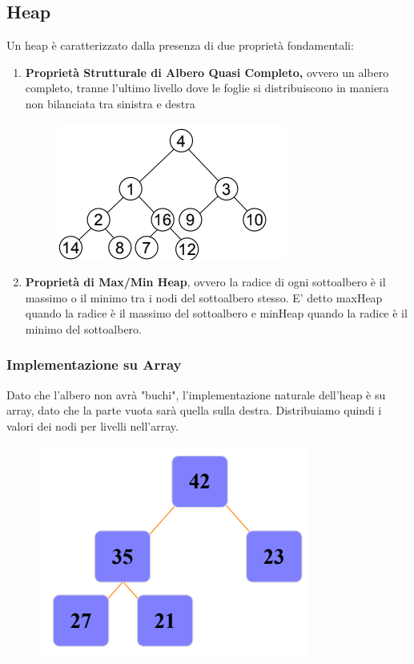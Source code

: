 \documentclass{article}
\begin{document}
\subsection{Heap}

Un heap è caratterizzato dalla presenza di due proprietà fondamentali:

\begin{enumerate}
    \item \textbf{Proprietà Strutturale di Albero Quasi Completo,} ovvero un albero completo, tranne l'ultimo livello dove le foglie si distribuiscono in maniera non bilanciata tra sinistra e destra

    \begin{figure}[htbp]
        \center
        \includegraphics[scale=0.7]{img/alberoQuasiCompleto.png}
    \end{figure}

    \item \textbf{Proprietà di Max/Min Heap}, ovvero la radice di ogni sottoalbero è il massimo o il minimo tra i nodi del sottoalbero stesso. E' detto maxHeap quando la radice è il massimo del sottoalbero e minHeap quando la radice è il minimo del sottoalbero.

\end{enumerate}

\subsubsection{Implementazione su Array} Dato che l'albero non avrà "buchi", l'implementazione naturale dell'heap è su array, dato che la parte vuota sarà quella sulla destra. Distribuiamo quindi i valori dei nodi per livelli nell'array.

\begin{figure}[htbp]
        \center
        \includegraphics[scale=0.5]{img/heap1.png}
    \end{figure}
\end{document}
